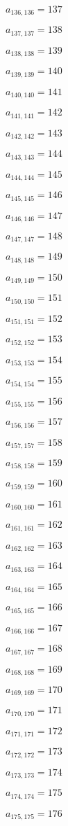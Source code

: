 \documentclass[a4paper,12pt]{article}
\begin{document}
$a _{ 136, 136 } = 137$

$a _{ 137, 137 } = 138$

$a _{ 138, 138 } = 139$

$a _{ 139, 139 } = 140$

$a _{ 140, 140 } = 141$

$a _{ 141, 141 } = 142$

$a _{ 142, 142 } = 143$

$a _{ 143, 143 } = 144$

$a _{ 144, 144 } = 145$

$a _{ 145, 145 } = 146$

$a _{ 146, 146 } = 147$

$a _{ 147, 147 } = 148$

$a _{ 148, 148 } = 149$

$a _{ 149, 149 } = 150$

$a _{ 150, 150 } = 151$

$a _{ 151, 151 } = 152$

$a _{ 152, 152 } = 153$

$a _{ 153, 153 } = 154$

$a _{ 154, 154 } = 155$

$a _{ 155, 155 } = 156$

$a _{ 156, 156 } = 157$

$a _{ 157, 157 } = 158$

$a _{ 158, 158 } = 159$

$a _{ 159, 159 } = 160$

$a _{ 160, 160 } = 161$

$a _{ 161, 161 } = 162$

$a _{ 162, 162 } = 163$

$a _{ 163, 163 } = 164$

$a _{ 164, 164 } = 165$

$a _{ 165, 165 } = 166$

$a _{ 166, 166 } = 167$

$a _{ 167, 167 } = 168$

$a _{ 168, 168 } = 169$

$a _{ 169, 169 } = 170$

$a _{ 170, 170 } = 171$

$a _{ 171, 171 } = 172$

$a _{ 172, 172 } = 173$

$a _{ 173, 173 } = 174$

$a _{ 174, 174 } = 175$

$a _{ 175, 175 } = 176$
\end{document}
